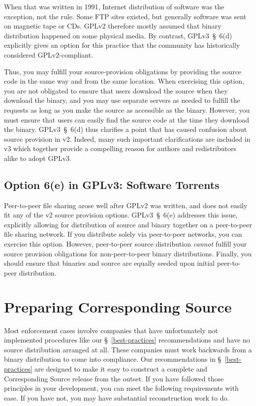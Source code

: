 When that was written in 1991, Internet distribution of software was the
exception, not the rule.  Some FTP sites existed, but generally software
was sent on magnetic tape or CDs.  GPLv2 therefore mostly assumed that
binary distribution happened on some physical media.  By contrast,
GPLv3~\S~6(d) explicitly gives an option for this practice that the
community has historically considered GPLv2-compliant.

Thus, you may fulfill your source-provision obligations by providing the
source code in the same way and from the same location.  When exercising
this option, you are not obligated to ensure that users download the
source when they download the binary, and you may use separate servers as
needed to fulfill the requests as long as you make the source as
accessible as the binary.  However, you must ensure that users can easily
find the source code at the time they download the binary. GPLv3~\S~6(d)
thus clarifies a point that has caused confusion about source provision in
v2.  Indeed, many such important clarifications are included in v3 which
together provide a compelling reason for authors and redistributors alike
to adopt GPLv3.

\subsection{Option 6(e) in GPLv3: Software Torrents}

Peer-to-peer file sharing arose well after GPLv2 was written, and does not
easily fit any of the v2 source provision options.  GPLv3~\S~6(e)
addresses this issue, explicitly allowing for distribution of source and
binary together on a peer-to-peer file sharing network.  If you distribute
solely via peer-to-peer networks, you can exercise this option.  However,
peer-to-peer source distribution \emph{cannot} fulfill your source
provision obligations for non-peer-to-peer binary distributions.  Finally,
you should ensure that binaries and source are equally seeded upon initial
peer-to-peer distribution.

\section{Preparing Corresponding Source}
\label{corresponding-source}

Most enforcement cases involve companies that have unfortunately not
implemented procedures like our \S~\ref{best-practices} recommendations
and have no source distribution arranged at all.  These companies must
work backwards from a binary distribution to come into compliance.  Our
recommendations in \S~\ref{best-practices} are designed to make it easy to
construct a complete and Corresponding Source release from the outset.  If
you have followed those principles in your development, you can meet the
following requirements with ease.  If you have not, you may have
substantial reconstruction work to do.

